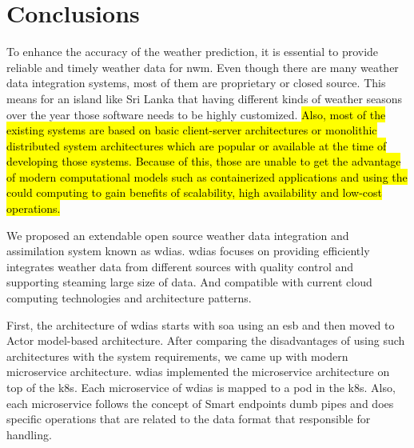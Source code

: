 \section{Conclusions}
\label{se:summary_conclusion}

To enhance the accuracy of the weather prediction, it is essential to provide reliable and timely weather data for \acrshort{nwm}. Even though there are many weather data integration systems, most of them are proprietary or closed source. This means for an island like Sri Lanka that having different kinds of weather seasons over the year those software needs to be highly customized. %
\hl{Also, most of the existing systems are based on basic client-server architectures or monolithic distributed system architectures which are popular or available at the time of developing those systems. Because of this, those are unable to get the advantage of modern computational models such as containerized applications and using the could computing to gain benefits of scalability, high availability and low-cost operations.}


We proposed an extendable open source weather data integration and assimilation system known as \acrshort{wdias}. \acrshort{wdias} focuses on providing efficiently integrates weather data from different sources with quality control and supporting steaming large size of data. And compatible with current cloud computing technologies and architecture patterns.

First, the architecture of \acrshort{wdias} starts with \acrshort{soa} using an \acrfull{esb} and then moved to Actor model-based architecture. After comparing the disadvantages of using such architectures with the system requirements, we came up with modern microservice architecture.
\acrshort{wdias} implemented the microservice architecture on top of the \acrshort{k8s}. Each microservice of \acrshort{wdias} is mapped to a pod in the \acrshort{k8s}. Also, each microservice follows the concept of Smart endpoints dumb pipes and does specific operations that are related to the data format that responsible for handling.

